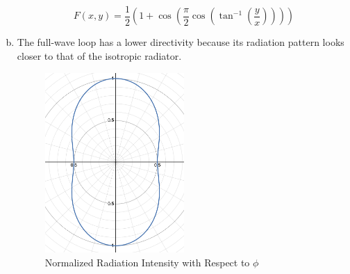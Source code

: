 \documentclass{article} %
\begin{document}
\begin{enumerate}[(a)]
            \[\boxed{F(x, y) = \frac{1}{2} \left(1 + \cos\left(\frac{\pi}{2} \cos\left(\tan^{-1} \left(\frac{y}{x}\right)\right)\right)\right)}\]
      \item The full-wave loop has a lower directivity because its radiation pattern looks closer to that of the isotropic radiator.
            \begin{figure}[H]
                  \centering
                  \includegraphics[width=0.5\textwidth]{./image/figure4.png}
                  \caption{Normalized Radiation Intensity with Respect to $\phi$}
            \end{figure}
\end{enumerate}
\end{document}

